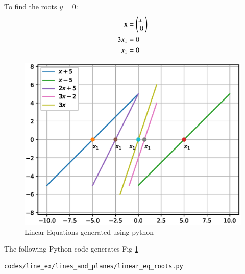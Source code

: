 \begin{enumerate}
To find the roots $y=0$:
\begin{align}
\mathbf{x} &= \begin{pmatrix}x_1\\0\end{pmatrix} \\
3x_1  &= 0 \\
x_1 &= 0
\end{align}
\begin{figure}[!ht] 
\centering
\includegraphics[width=\columnwidth]{./figs/line_ex/lines_and_planes/final_eq.eps}
\caption{Linear Equations generated using python}
\label{fig:eq_lines_and_planes}
\end{figure}
 
The  following Python code generates Fig \ref{fig:eq_lines_and_planes}
\begin{lstlisting}
codes/line_ex/lines_and_planes/linear_eq_roots.py
\end{lstlisting}

\end{enumerate}
